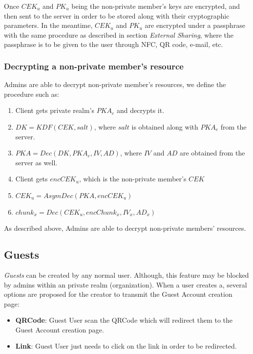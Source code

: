 \documentclass[a4paper,9pt,twoside]{article}
\begin{document}
Once $CEK_u$ and $PK_u$ being the non-private member's keys are encrypted, and then sent to the server 
in order to be stored along with their cryptographic parameters. In the meantime, 
$CEK_u$ and $PK_u$ are encrypted under a passphrase  with the same procedure as described in section 
\emph{External Sharing}, where the passphrase is to be given to the user through NFC, 
QR code, e-mail, etc.

\subsubsection{Decrypting a non-private member's resource}

    Admins are able to decrypt non-private member's resources, we define 
the procedure such as:

\begin{enumerate}
\itemsep0em
\item Client gets private realm's $PKA_e$ and decrypts it.
\item $DK=KDF(CEK, salt)$, where $salt$ is obtained along with $PKA_e$ from the server.
\item $PKA=Dec(DK, PKA_e, IV, AD)$, where $IV$ and $AD$ are obtained from the server as well.
\item Client gets $encCEK_u$, which is the non-private member's $CEK$
\item $CEK_u=AsymDec(PKA, encCEK_u)$
\item $chunk_x=Dec(CEK_u, encChunk_x, IV_x, AD_x)$
\end{enumerate}

    As described above, Admins are able to decrypt non-private members' resources.

\subsection{Guests}

\emph{Guests} can be created by any normal user. Although, this feature may be blocked by admins 
within an private realm (organization). When a user creates a, several options are proposed for the creator 
to transmit the Guest Account creation page:

\begin{itemize}
\itemsep0em
\item \textbf{QRCode}: Guest User scan the QRCode which will redirect them to 
the Guest Account creation page.
\item \textbf{Link}: Guest User just needs to click on the link in order to be redirected.
\end{itemize}
\end{document}
